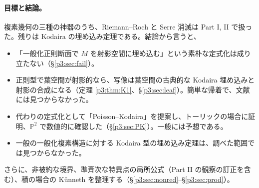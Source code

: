 \paragraph{目標と結論。}
複素幾何の三種の神器のうち、Riemann--Roch と Serre 消滅は Part I, II で扱った。残りは Kodaira の埋め込み定理である。結論から言うと、
\begin{itemize}
\item 「一般化正則断面で $M$ を射影空間に埋め込む」という素朴な定式化は成り立たない（\S\ref{p3:sec:fail}）\tP。
\item 正則型で葉空間が射影的なら、写像は葉空間の古典的な Kodaira 埋め込みと射影の合成になる（定理 \ref{p3:thm:K1}、\S\ref{p3:sec:leaf}）\tP。簡単な帰着で、文献には見つからなかった。
\item 代わりの定式化として「Poisson--Kodaira」を提案し、トーリックの場合に証明、$\mathbb P^2$ で数値的に確認した（\S\ref{p3:sec:PK}）。一般には予想である\tK。
\item 一般の一般化複素構造に対する Kodaira 型の埋め込み定理は、調べた範囲では見つからなかった\tC。
\end{itemize}
さらに、非被約な境界、準斉次な特異点の局所公式（Part II の観察の訂正を含む）、積の場合の Künneth を整理する（\S\ref{p3:sec:nonred}--\S\ref{p3:sec:prod}）。

